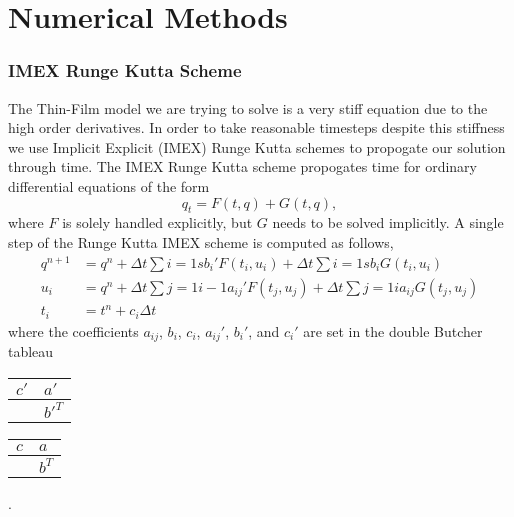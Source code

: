 \chapter{Numerical Methods}
\subsection{IMEX Runge Kutta Scheme}\label{ssec:imex}
The Thin-Film model we are trying to solve is a very stiff equation due to the
high order derivatives.
In order to take reasonable timesteps despite this stiffness we use Implicit
Explicit (IMEX) Runge Kutta schemes to propogate our solution through time.
The IMEX Runge Kutta scheme propogates time for ordinary differential
equations of the form
\begin{equation}
  q_t = F(t, q) + G(t, q),
\end{equation}
where \(F\) is solely handled explicitly, but \(G\) needs to be solved implicitly.
A single step of the Runge Kutta IMEX scheme is computed as follows,
\begin{align}
  q^{n+1} &= q^n + \Delta t \sum{i = 1}{s}{b_i' F(t_i, u_i)} + \Delta t \sum{i=1}{s}{b_i G(t_i, u_i)} \\
  u_i &= q^n + \Delta t \sum{j = 1}{i-1}{a_{ij}' F(t_j, u_j)} + \Delta t \sum{j=1}{i}{a_{ij} G(t_j, u_j)} \\
  t_i &= t^n + c_i \Delta t
\end{align}
where the coefficients \(a_{ij}\), \(b_i\), \(c_i\), \(a_{ij}'\), \(b_i'\), and \(c_i'\)
are set in the double Butcher tableau
\begin{center}
  \begin{tabular}{r|l}
    \(c'\) & \(a'\) \\
    \midrule
      & \(b'^T\)
  \end{tabular}\hspace{0.5cm}
  \begin{tabular}{r|l}
    \(c\) & \(a\) \\
    \midrule
      & \(b^T\)
  \end{tabular}.
\end{center}

